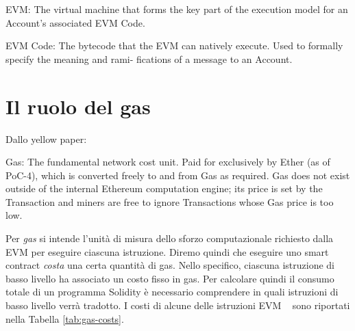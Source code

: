 EVM: The virtual machine that forms the key part of the execution model
for an Account’s associated EVM Code.

EVM Code: The bytecode that the EVM can natively execute. Used to formally specify the meaning and rami-
fications of a message to an Account.

\section{Il ruolo del gas}

Dallo yellow paper:

Gas: The fundamental network cost unit. Paid for exclusively by Ether (as of PoC-4), which is converted freely
to and from Gas as required. Gas does not exist outside of the internal Ethereum computation engine; its price
is set by the Transaction and miners are free to ignore Transactions whose Gas price is too low.

Per \textit{gas} si intende l'unità di misura dello sforzo computazionale richiesto dalla EVM per eseguire ciascuna istruzione. Diremo quindi che eseguire uno smart contract \emph{costa} una certa quantità di gas. Nello specifico, ciascuna istruzione di basso livello ha associato un costo fisso in gas. Per calcolare quindi il consumo totale di un programma Solidity è necessario comprendere in quali istruzioni di basso livello verrà tradotto.\newline
I costi di alcune delle istruzioni EVM ~\cite{wood2014ethereum} sono riportati nella Tabella \ref{tab:gas-costs}.


